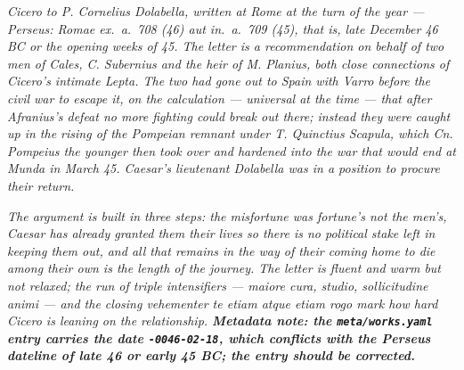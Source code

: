
\textit{Cicero to P. Cornelius Dolabella, written at Rome at the
turn of the year --- Perseus: \textit{Romae ex.~a.~708 (46) aut
in.~a.~709 (45)}, that is, late December 46 BC or the opening
weeks of 45. The letter is a recommendation on behalf of two men
of Cales, C. Subernius and the heir of M. Planius, both close
connections of Cicero's intimate Lepta. The two had gone out to
Spain with Varro before the civil war to escape it, on the
calculation --- universal at the time --- that after Afranius's
defeat no more fighting could break out there; instead they were
caught up in the rising of the Pompeian remnant under T. Quinctius
Scapula, which Cn. Pompeius the younger then took over and
hardened into the war that would end at Munda in March 45.
Caesar's lieutenant Dolabella was in a position to procure their
return.}

\textit{The argument is built in three steps: the misfortune was
fortune's not the men's, Caesar has already granted them their
lives so there is no political stake left in keeping them out, and
all that remains in the way of their coming home to die among
their own is the length of the journey. The letter is fluent and
warm but not relaxed; the run of triple intensifiers ---
\textit{maiore cura, studio, sollicitudine animi} --- and the
closing \textit{vehementer te etiam atque etiam rogo} mark how
hard Cicero is leaning on the relationship. \textbf{Metadata
note: the \texttt{meta/works.yaml} entry carries the date
\texttt{-0046-02-18}, which conflicts with the Perseus dateline
of late 46 or early 45 BC; the entry should be corrected.}}
